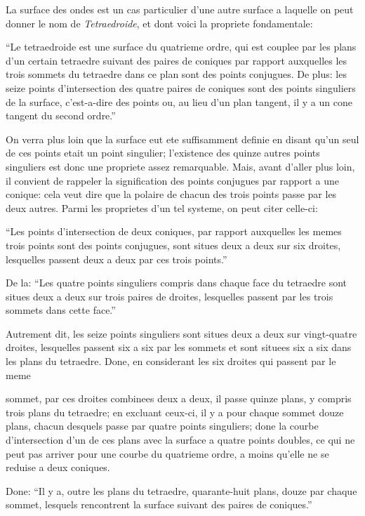 \documentclass[11pt,a4paper]{article}
\begin{document}
\vspace{6pt}

La surface des ondes est un cas particulier d'une autre surface a laquelle on peut donner le nom de \textit{Tetraedroide}, et dont voici la propriete fondamentale:

``Le tetraedroide est une surface du quatrieme ordre, qui est couplee par les plans d'un certain tetraedre suivant des paires de coniques par rapport auxquelles les trois sommets du tetraedre dans ce plan sont des points conjugues. De plus: les seize points d'intersection des quatre paires de coniques sont des points singuliers de la surface, c'est-a-dire des points ou, au lieu d'un plan tangent, il y a un cone tangent du second ordre.''

On verra plus loin que la surface eut ete suffisamment definie en disant qu'un seul de ces points etait un point singulier; l'existence des quinze autres points singuliers est donc une propriete assez remarquable. Mais, avant d'aller plus loin, il convient de rappeler la signification des points conjugues par rapport a une conique: cela veut dire que la polaire de chacun des trois points passe par les deux autres. Parmi les proprietes d'un tel systeme, on peut citer celle-ci:

``Les points d'intersection de deux coniques, par rapport auxquelles les memes trois points sont des points conjugues, sont situes deux a deux sur six droites, lesquelles passent deux a deux par ces trois points.''

De la: ``Les quatre points singuliers compris dans chaque face du tetraedre sont situes deux a deux sur trois paires de droites, lesquelles passent par les trois sommets dans cette face.''

Autrement dit, les seize points singuliers sont situes deux a deux sur vingt-quatre droites, lesquelles passent six a six par les sommets et sont situees six a six dans les plans du tetraedre. Done, en considerant les six droites qui passent par le meme

\newpage
sommet, par ces droites combinees deux a deux, il passe quinze plans, y compris trois plans du tetraedre; en excluant ceux-ci, il y a pour chaque sommet douze plans, chacun desquels passe par quatre points singuliers; done la courbe d'intersection d'un de ces plans avec la surface a quatre points doubles, ce qui ne peut pas arriver pour une courbe du quatrieme ordre, a moins qu'elle ne se reduise a deux coniques.

Done: ``Il y a, outre les plans du tetraedre, quarante-huit plans, douze par chaque sommet, lesquels rencontrent la surface suivant des paires de coniques.''
\end{document}
